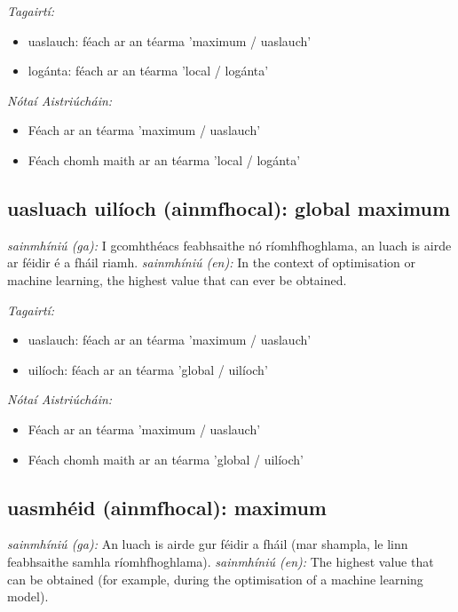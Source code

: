 \documentclass{article}
\begin{document}
 \noindent \textit{Tagairtí:}
\begin{itemize}
	\item uaslauch: féach ar an téarma 'maximum / uaslauch'
	\item logánta: féach ar an téarma 'local / logánta'
\end{itemize}

 \noindent \textit{Nótaí Aistriúcháin:}
\begin{itemize}
	\item Féach ar an téarma 'maximum / uaslauch'
	\item Féach chomh maith ar an téarma 'local / logánta'
\end{itemize}


\subsection*{uasluach uilíoch (ainmfhocal): global maximum} 
 \noindent \textit{sainmhíniú (ga):} I gcomhthéacs feabhsaithe nó ríomhfhoghlama, an luach is airde ar féidir é a fháil riamh.
\newline\newline
 \noindent \textit{sainmhíniú (en):} In the context of optimisation or machine learning, the highest value that can ever be obtained.
\newline

 \noindent \textit{Tagairtí:}
\begin{itemize}
	\item uaslauch: féach ar an téarma 'maximum / uaslauch'
	\item uilíoch: féach ar an téarma 'global / uilíoch'
\end{itemize}

 \noindent \textit{Nótaí Aistriúcháin:}
\begin{itemize}
	\item Féach ar an téarma 'maximum / uaslauch'
	\item Féach chomh maith ar an téarma 'global / uilíoch'
\end{itemize}


\subsection*{uasmhéid (ainmfhocal): maximum} 
 \noindent \textit{sainmhíniú (ga):} An luach is airde gur féidir a fháil (mar shampla, le linn feabhsaithe samhla ríomhfhoghlama).
\newline\newline
 \noindent \textit{sainmhíniú (en):} The highest value that can be obtained (for example, during the optimisation of a machine learning model).
\newline
\end{document}

